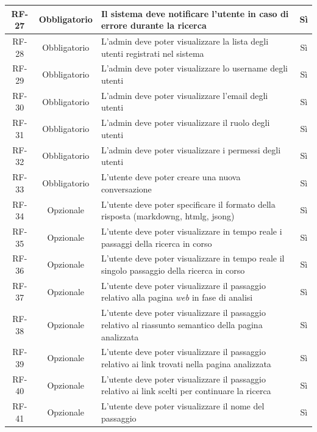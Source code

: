 \begin{center}
\begin{xltabular}{\textwidth}{|c|c| >{\arraybackslash}X|c|}
        \hline
        RF-27 & Obbligatorio & Il sistema deve notificare l'utente in caso di errore durante la ricerca & Sì \\
        \hline
        RF-28 & Obbligatorio & L'admin deve poter visualizzare la lista degli utenti registrati nel sistema & Sì \\
        \hline
        RF-29 & Obbligatorio & L'admin deve poter visualizzare lo username degli utenti & Sì \\
        \hline
        RF-30 & Obbligatorio & L'admin deve poter visualizzare l'email degli utenti & Sì \\
        \hline
        RF-31 & Obbligatorio & L'admin deve poter visualizzare il ruolo degli utenti & Sì \\
        \hline
        RF-32 & Obbligatorio & L'admin deve poter visualizzare i permessi degli utenti & Sì \\
        \hline
        RF-33 & Obbligatorio & L'utente deve poter creare una nuova conversazione & Sì \\
        \hline
        RF-34 & Opzionale & L'utente deve poter specificare il formato della risposta (\gls{markdowng}, \gls{htmlg}, \gls{jsong}) & Sì \\
        \hline
        RF-35 & Opzionale & L'utente deve poter visualizzare in tempo reale i passaggi della ricerca in corso & Sì \\
        \hline
        RF-36 & Opzionale & L'utente deve poter visualizzare in tempo reale il singolo passaggio della ricerca in corso & Sì \\
        \hline
        RF-37 & Opzionale & L'utente deve poter visualizzare il passaggio relativo alla pagina \textit{web} in fase di analisi & Sì \\
        \hline
        RF-38 & Opzionale & L'utente deve poter visualizzare il passaggio relativo al riassunto semantico della pagina analizzata & Sì \\
        \hline
        RF-39 & Opzionale & L'utente deve poter visualizzare il passaggio relativo ai link trovati nella pagina analizzata & Sì \\
        \hline
        RF-40 & Opzionale & L'utente deve poter visualizzare il passaggio relativo ai link scelti per continuare la ricerca & Sì \\
        \hline
        RF-41 & Opzionale & L'utente deve poter visualizzare il nome del passaggio & Sì \\

\end{xltabular}
\end{center}
